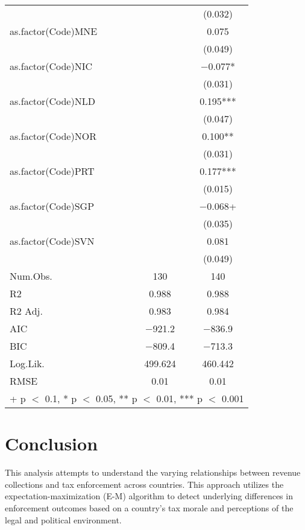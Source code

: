 \documentclass{MSword}
\begin{document}
\begin{table}
\begin{tabular}[t]{lcc}
 &  & (\num{0.032})\\
as.factor(Code)MNE &  & \num{0.075}\\
 &  & \vphantom{1} (\num{0.049})\\
as.factor(Code)NIC &  & \num{-0.077}*\\
 &  & \vphantom{1} (\num{0.031})\\
as.factor(Code)NLD &  & \num{0.195}***\\
 &  & (\num{0.047})\\
as.factor(Code)NOR &  & \num{0.100}**\\
 &  & (\num{0.031})\\
as.factor(Code)PRT &  & \num{0.177}***\\
 &  & (\num{0.015})\\
as.factor(Code)SGP &  & \num{-0.068}+\\
 &  & (\num{0.035})\\
as.factor(Code)SVN &  & \num{0.081}\\
 &  & (\num{0.049})\\
\midrule
Num.Obs. & \num{130} & \num{140}\\
R2 & \num{0.988} & \num{0.988}\\
R2 Adj. & \num{0.983} & \num{0.984}\\
AIC & \num{-921.2} & \num{-836.9}\\
BIC & \num{-809.4} & \num{-713.3}\\
Log.Lik. & \num{499.624} & \num{460.442}\\
RMSE & \num{0.01} & \num{0.01}\\
\bottomrule
\multicolumn{3}{l}{\rule{0pt}{1em}+ p $<$ 0.1, * p $<$ 0.05, ** p $<$ 0.01, *** p $<$ 0.001}\\
\end{tabular}
\end{table}


\section*{Conclusion}
This analysis attempts to understand the varying relationships between revenue collections and tax enforcement across countries. This approach utilizes the expectation-maximization (E-M) algorithm to detect underlying differences in enforcement outcomes based on a country's tax morale and perceptions of the legal and political environment.

\printbibliography[title={References}]
\end{document}
